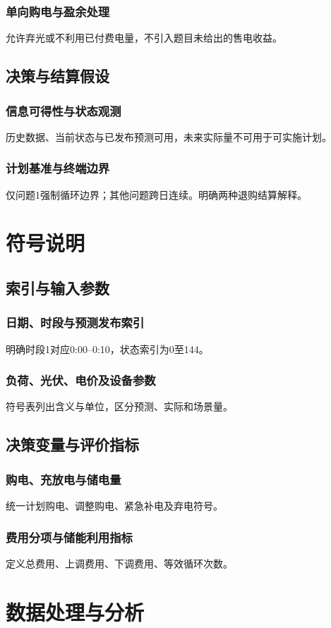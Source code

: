 \documentclass[UTF8,a4paper,zihao=-4]{ctexart}
\begin{document}
\subsubsection{单向购电与盈余处理}允许弃光或不利用已付费电量，不引入题目未给出的售电收益。
\subsection{决策与结算假设}
\subsubsection{信息可得性与状态观测}历史数据、当前状态与已发布预测可用，未来实际量不可用于可实施计划。
\subsubsection{计划基准与终端边界}仅问题1强制循环边界；其他问题跨日连续。明确两种退购结算解释。
\section{符号说明}
\subsection{索引与输入参数}
\subsubsection{日期、时段与预测发布索引}明确时段1对应0:00--0:10，状态索引为0至144。
\subsubsection{负荷、光伏、电价及设备参数}符号表列出含义与单位，区分预测、实际和场景量。
\subsection{决策变量与评价指标}
\subsubsection{购电、充放电与储电量}统一计划购电、调整购电、紧急补电及弃电符号。
\subsubsection{费用分项与储能利用指标}定义总费用、上调费用、下调费用、等效循环次数。
\section{数据处理与分析}
\end{document}
